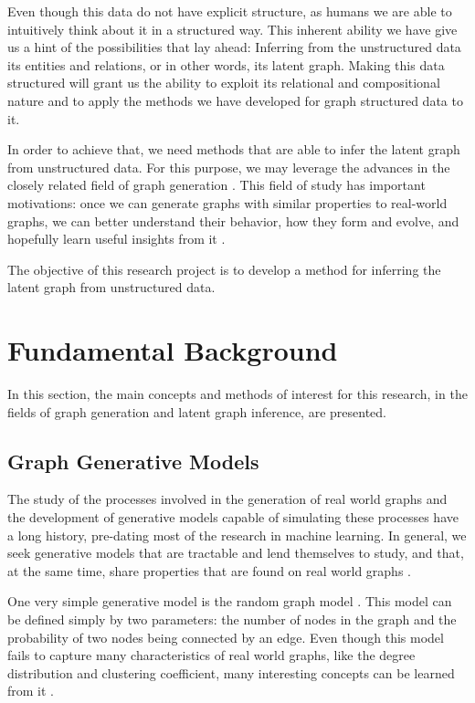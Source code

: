 \documentclass[12pt,a4paper]{article}
\begin{document}
	Even though this data do not have explicit structure, as humans we are able to intuitively think about it in a structured way. This inherent ability we have give us a hint of the possibilities that lay ahead: Inferring from the unstructured data its entities and relations, or in other words, its latent graph. Making this data structured will grant us the ability to exploit its relational and compositional nature and to apply the methods we have developed for graph structured data to it.
	
	In order to achieve that, we need methods that are able to infer the latent graph from unstructured data. For this purpose, we may leverage the advances in the closely related field of graph generation \citep{ErdösandRényi1960, AlbertandBarabási2002, KipfandWelling2016, Li2018}. This field of study has important motivations: once we can generate graphs with similar properties to real-world graphs, we can better understand their behavior, how they form and evolve, and hopefully learn useful insights from it \citep{Hamilton2020}.
	
	The objective of this research project is to develop a method for inferring the latent graph from unstructured data.
	
	\section{Fundamental Background}
	\label{sec:background}
	
	In this section, the main concepts and methods of interest for this research, in the fields of graph generation and latent graph inference, are presented.
	
	\subsection{Graph Generative Models}
	\label{sec:graph_generative_models}
	
	The study of the processes involved in the generation of real world graphs and the development of generative models capable of simulating these processes have a long history, pre-dating most of the research in machine learning. In general, we seek generative models that are tractable and lend themselves to study, and that, at the same time, share properties that are found on real world graphs \citep{Hamilton2020}.
	
	One very simple generative model is the random graph model \citep{ErdösandRényi1960}. This model can be defined simply by two parameters: the number of nodes in the graph and the probability of two nodes being connected by an edge. Even though this model fails to capture many characteristics of real world graphs, like the degree distribution and clustering coefficient, many interesting concepts can be learned from it \citep{Newman2019}.
	
\end{document}
